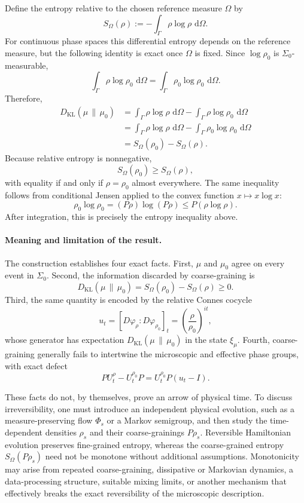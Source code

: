 \documentclass[a4paper,11pt]{article}
\theoremstyle{definition}
\newcommand{\dd}{\,\mathrm{d}}
\newcommand{\KLL}{D_{\mathrm{KL}}}
\begin{document}
Define the entropy relative to the chosen reference measure $\Omega$ by
\[
  S_\Omega(\rho):=-\int_\Gamma\rho\log\rho\,\dd\Omega.
\]
For continuous phase spaces this differential entropy depends on the reference measure, but the following identity is exact once $\Omega$ is fixed.  Since $\log\rho_0$ is $\Sigma_0$-measurable,
\[
  \int_\Gamma\rho\log\rho_0\,\dd\Omega
  =\int_\Gamma\rho_0\log\rho_0\,\dd\Omega.
\]
Therefore,
\begin{align*}
  \KLL(\mu\,\|\,\mu_0)
  &=\int_\Gamma\rho\log\rho\,\dd\Omega
    -\int_\Gamma\rho\log\rho_0\,\dd\Omega\\
  &=\int_\Gamma\rho\log\rho\,\dd\Omega
    -\int_\Gamma\rho_0\log\rho_0\,\dd\Omega\\
  &=S_\Omega(\rho_0)-S_\Omega(\rho).
\end{align*}
Because relative entropy is nonnegative,
\[
  S_\Omega(\rho_0)\geq S_\Omega(\rho),
\]
with equality if and only if $\rho=\rho_0$ almost everywhere.  The same inequality follows from conditional Jensen applied to the convex function $x\mapsto x\log x$:
\[
  \rho_0\log\rho_0
  =(P\rho)\log(P\rho)
  \leq P(\rho\log\rho).
\]
After integration, this is precisely the entropy inequality above.

\paragraph{Meaning and limitation of the result.}
The construction establishes four exact facts.  First, $\mu$ and $\mu_0$ agree on every event in $\Sigma_0$.  Second, the information discarded by coarse-graining is
\[
  \KLL(\mu\,\|\,\mu_0)
  =S_\Omega(\rho_0)-S_\Omega(\rho)\geq0.
\]
Third, the same quantity is encoded by the relative Connes cocycle
\[
  u_t=[D\varphi_\rho:D\varphi_{\rho_0}]_t
  =\left(\frac{\rho}{\rho_0}\right)^{it},
\]
whose generator has expectation $\KLL(\mu\,\|\,\mu_0)$ in the state $\xi_\mu$.  Fourth, coarse-graining generally fails to intertwine the microscopic and effective phase groups, with exact defect
\[
  PU_t^\rho-U_t^{\rho_0}P
  =U_t^{\rho_0}P(u_t-I).
\]

These facts do not, by themselves, prove an arrow of physical time.  To discuss irreversibility, one must introduce an independent physical evolution, such as a measure-preserving flow $\Phi_s$ or a Markov semigroup, and then study the time-dependent densities $\rho_s$ and their coarse-grainings $P\rho_s$.  Reversible Hamiltonian evolution preserves fine-grained entropy, whereas the coarse-grained entropy $S_\Omega(P\rho_s)$ need not be monotone without additional assumptions.  Monotonicity may arise from repeated coarse-graining, dissipative or Markovian dynamics, a data-processing structure, suitable mixing limits, or another mechanism that effectively breaks the exact reversibility of the microscopic description.
\end{document}
